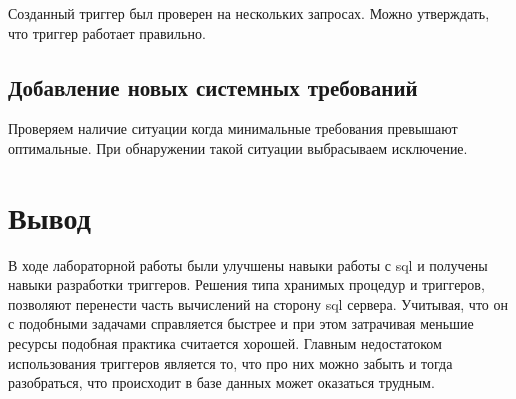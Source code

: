 \documentclass[a4paper,14pt]{extarticle}
\begin{document}


Созданный триггер был проверен на нескольких запросах. Можно утверждать, что триггер работает правильно.

\subsection{Добавление новых системных требований}
Проверяем наличие ситуации когда минимальные требования превышают оптимальные. При обнаружении такой ситуации выбрасываем исключение.



\section{Вывод}
В ходе лабораторной работы были улучшены навыки работы с sql и получены навыки разработки триггеров. Решения типа хранимых процедур и триггеров, позволяют перенести часть вычислений на сторону sql сервера. Учитывая, что он с подобными задачами справляется быстрее и при этом затрачивая меньшие ресурсы подобная практика считается хорошей. Главным недостатоком использования триггеров является то, что про них можно забыть и тогда разобраться, что происходит в базе данных может оказаться трудным.
\end{document}
